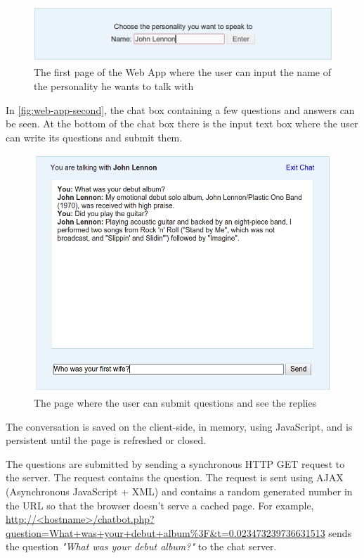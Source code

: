 \begin{figure}[htb]
  \centering
  \captionsetup{justification=centering}
  \includegraphics[width=\textwidth]{src/img/web-app-first.png}
  \caption[Web Application - First Window]{The first page of the Web App where the user can input the name of the personality he wants to talk with}
  \label{fig:web-app-first}
\end{figure}

In \autoref{fig:web-app-second}, the chat box containing a few questions and answers can be seen. At the bottom of the chat box there is the input text box where the user can write its questions and submit them.

\begin{figure}[htb]
  \centering
  \captionsetup{justification=centering}
  \includegraphics[width=\textwidth]{src/img/web-app-second.png}
  \caption[Web Application - Second Window]{The page where the user can submit questions and see the replies}
  \label{fig:web-app-second}
\end{figure}

The conversation is saved on the client-side, in memory, using JavaScript, and is persistent until the page is refreshed or closed.

The questions are submitted by sending a synchronous HTTP GET request to the server. The request contains the question. The request is sent using AJAX (Asynchronous JavaScript + XML) and contains a random generated number in the URL so that the browser doesn't serve a cached page. For example, \url{http://<hostname>/chatbot.php?question=What+was+your+debut+album\%3F\&t=0.023473239736631513} sends the question {\em "What was your debut album?"} to the chat server.

